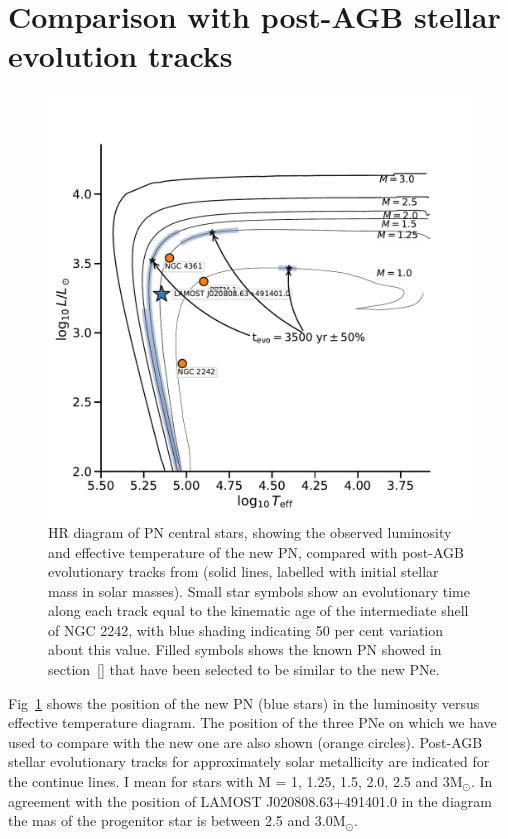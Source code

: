 \documentclass[fleqn,usenatbib]{mnras}
\begin{document}
{\section{Comparison with post-AGB stellar evolution tracks}
\label{sec:tracks}

\begin{figure}
\centering
  \includegraphics[width=\linewidth]{Figs/hr-planetarieNebula}
  \caption{HR diagram of PN central stars, showing the observed luminosity
and effective temperature of the new PN, compared with
post-AGB evolutionary tracks from \citet{Miller:2016} (solid lines,
labelled with initial stellar mass in solar masses). Small star symbols show
an evolutionary time along each track equal to the kinematic age of the
intermediate shell of NGC 2242, with blue shading indicating 50 per cent
variation about this value.  Filled symbols shows the known PN showed in section~\ref{}
that have been selected to be  similar to the new PNe.} 
 \label{fig:track-evolutive}
\end{figure}

Fig~\ref{fig:track-evolutive} shows the position of the new PN (blue stars) in the luminosity
versus effective temperature diagram. The position of the three PNe on which we have used to
compare with the new one are also shown (orange circles). Post-AGB stellar evolutionary tracks for
approximately solar metallicity \citep{Miller:2016} are indicated for the continue lines.
I mean for stars with M = 1, 1.25, 1.5, 2.0, 2.5 and 3M$_{\odot}$. In agreement with the position of LAMOST
J020808.63+491401.0 in the diagram the mas of the progenitor star is between 2.5 and 3.0M$_{\odot}$.

}
\end{document}
